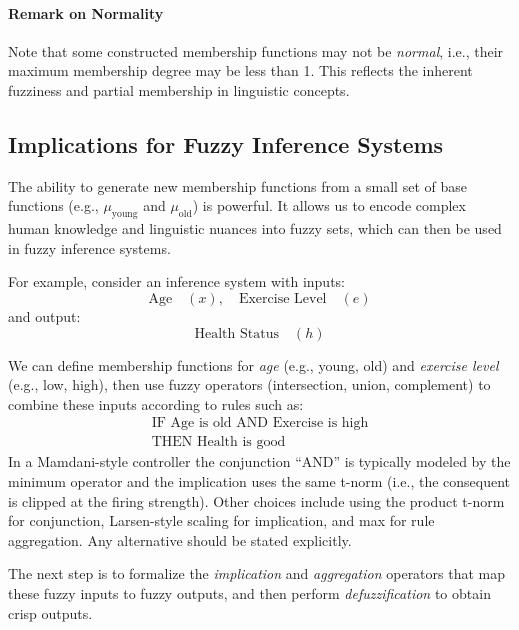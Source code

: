 \paragraph{Remark on Normality}
Note that some constructed membership functions may not be \emph{normal}, i.e., their maximum membership degree may be less than 1. This reflects the inherent fuzziness and partial membership in linguistic concepts.

\subsection{Implications for Fuzzy Inference Systems}
\label{sec:fuzzysets_implications_for_fuzzy_inference_systems}

The ability to generate new membership functions from a small set of base functions (e.g., \(\mu_{\text{young}}\) and \(\mu_{\text{old}}\)) is powerful. It allows us to encode complex human knowledge and linguistic nuances into fuzzy sets, which can then be used in fuzzy inference systems.

For example, consider an inference system with inputs:
\[
\text{Age} \quad (x), \quad \text{Exercise Level} \quad (e)
\]
and output:
\[
\text{Health Status} \quad (h)
\]

We can define membership functions for \emph{age} (e.g., young, old) and \emph{exercise level} (e.g., low, high), then use fuzzy operators (intersection, union, complement) to combine these inputs according to rules such as:
\[
\begin{aligned}
\text{IF Age is old AND Exercise is high}\\
\text{THEN Health is good}
\end{aligned}
\]
In a Mamdani-style controller the conjunction ``AND'' is typically modeled by the minimum operator and the implication uses the same t\hyp{}norm (i.e., the consequent is clipped at the firing strength). Other choices include using the product t\hyp{}norm for conjunction, Larsen-style scaling for implication, and max for rule aggregation. Any alternative should be stated explicitly.

The next step is to formalize the \emph{implication} and \emph{aggregation} operators that map these fuzzy inputs to fuzzy outputs, and then perform \emph{defuzzification} to obtain crisp outputs.


